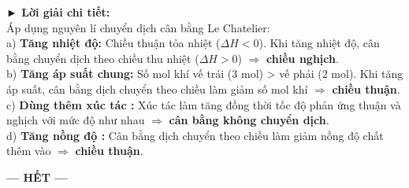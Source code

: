 \documentclass[11pt,a4paper]{article}
\begin{document}
\begin{tcolorbox}[colback=white,colframe=solBlue,arc=1mm,boxrule=0.5pt,top=2mm,bottom=2mm,left=3mm,right=3mm]
{\color{solBlue}\textbf{► Lời giải chi tiết:}}\\
Áp dụng nguyên lí chuyển dịch cân bằng Le Chatelier:\\
a) \textbf{Tăng nhiệt độ:} Chiều thuận tỏa nhiệt ($\Delta H < 0$). Khi tăng nhiệt độ, cân bằng chuyển dịch theo chiều thu nhiệt ($\Delta H > 0$) $\Rightarrow$ \textbf{chiều nghịch}.\\
b) \textbf{Tăng áp suất chung:} Số mol khí vế trái ($3\text{ mol}$) > vế phải ($2\text{ mol}$). Khi tăng áp suất, cân bằng dịch chuyển theo chiều làm giảm số mol khí $\Rightarrow$ \textbf{chiều thuận}.\\
c) \textbf{Dùng thêm xúc tác :} Xúc tác làm tăng đồng thời tốc độ phản ứng thuận và nghịch với mức độ như nhau $\Rightarrow$ \textbf{cân bằng không chuyển dịch}.\\
d) \textbf{Tăng nồng độ :} Cân bằng dịch chuyển theo chiều làm giảm nồng độ chất thêm vào $\Rightarrow$ \textbf{chiều thuận}.
\end{tcolorbox}

\begin{center}
\textbf{--- HẾT ---}
\end{center}
\end{document}
